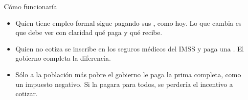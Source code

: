 \begin{frame}{Cómo funcionaría}
  \vspace{0.5em}
  \begin{itemize}\setlength{\itemsep}{0.35em}
    \item Quien tiene empleo formal sigue pagando sus , como hoy. Lo que cambia es que debe ver con claridad qué paga y qué recibe.
    \item Quien no cotiza se inscribe en los seguros médicos del IMSS y paga una . El gobierno completa la diferencia.
    \item Sólo a la población más pobre el gobierno le paga la prima completa, como un impuesto negativo. Si la pagara para todos, se perdería el incentivo a cotizar.
  \end{itemize}
  \vspace{-0.2em}
  \vspace{-0.9em}
\end{frame}
